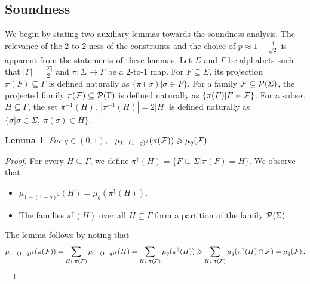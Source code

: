 \documentclass[11pt]{article}
\numberwithin{equation}{section}
\newtheorem{lemma}[theorem]{Lemma}
\theoremstyle{definition}
\theoremstyle{plain}
\renewcommand\geq{\geqslant}
\begin{document}
\subsection{Soundness}\label{appendix:blc_analysis}

We begin by stating two auxiliary lemmas towards the soundness analysis. The relevance of the $2$-to-$2$-ness of the
constraints and the choice of $p \approx 1-\frac{1}{\sqrt{2}}$ is apparent from the statements of these lemmas.
Let $\Sigma$ and $\Gamma$ be alphabets such that $|\Gamma| = \frac{|\Sigma|}{2}$ and $\pi: \Sigma \to \Gamma$
be a $2$-to-$1$ map. For $F \subseteq \Sigma$, its projection $\pi(F) \subseteq \Gamma$ is defined naturally as
$\{\pi(\sigma) | \sigma \in F\}$. For a family ${\cal F} \subseteq {\cal P}(\Sigma)$, the projected family
$\pi({\cal F}) \subseteq {\cal P}(\Gamma)$ is defined naturally as $\{ \pi(F) | F \in {\cal F}\}$. For a
subset $H \subseteq \Gamma$, the set $\pi^{-1}(H), ~|\pi^{-1}(H)|= 2|H|$ is defined naturally as
$\{ \sigma | \sigma \in \Sigma, ~\pi(\sigma) \in H \}.$

\begin{lemma}\label{lem:aux-1}  For $q \in (0,1)$, ~$\mu_{1-(1-q)^2} ( \pi( {\cal F} ) ) \geq  \mu_q ( {\cal F} ). $
\end{lemma}
\begin{proof} For every $H \subseteq \Gamma$, we define $\pi^{\uparrow}(H) = \{ F \subseteq \Sigma | \pi(F) = H \}$. We observe that
\begin{itemize}
\item $\mu_{1-(1-q)^2} ( H ) =   \mu_q ( \pi^{\uparrow} (H)  ). $
\item The families $\pi^{\uparrow}(H)$ over all $H \subseteq \Gamma$
%
form a  %
%
partition of the family ${\cal P} (\Sigma)$.
\end{itemize}
The lemma follows by noting that
\[
 \mu_{1-(1-q)^2} ( \pi( {\cal F} ) ) = \sum_{H \in \pi( {\cal F} )} \mu_{1-(1-q)^2}(H) =
 \sum_{H \in \pi( {\cal F} )} \mu_q ( \pi^{\uparrow} (H)  ) \geq  \sum_{H \in \pi( {\cal F} )} \mu_q ( \pi^{\uparrow} (H) \cap {\cal F} )  =
 \mu_q ({\cal F})\,.   \qedhere%
\]
\end{proof}
\end{document}
